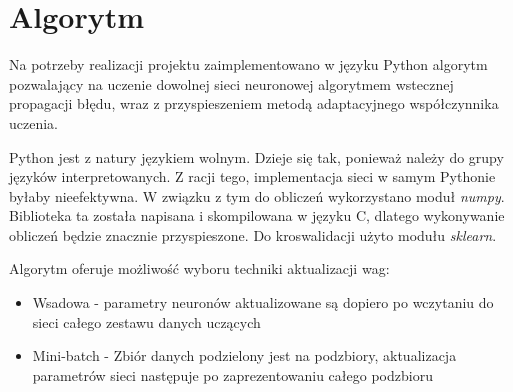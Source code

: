 \documentclass[12pt,twoside]{article}
\begin{document}
\section{Algorytm}

Na potrzeby realizacji projektu zaimplementowano w języku Python algorytm pozwalający na uczenie dowolnej sieci neuronowej algorytmem wstecznej propagacji błędu, wraz z przyspieszeniem metodą adaptacyjnego współczynnika uczenia. 

Python jest z natury językiem wolnym. Dzieje się tak, ponieważ należy do grupy języków interpretowanych. Z racji tego, implementacja sieci w samym Pythonie byłaby nieefektywna. W związku z tym do obliczeń wykorzystano moduł \textit{numpy}. Biblioteka ta została napisana i skompilowana w języku C, dlatego wykonywanie obliczeń będzie znacznie przyspieszone. Do kroswalidacji użyto modułu \textit{sklearn}.

Algorytm oferuje możliwość wyboru techniki aktualizacji wag:
\begin{itemize}
\item Wsadowa -  parametry neuronów aktualizowane są dopiero po wczytaniu do sieci całego zestawu danych uczących
\item Mini-batch -  Zbiór danych podzielony jest na podzbiory, aktualizacja parametrów sieci następuje po zaprezentowaniu całego podzbioru

\end{itemize}
\end{document}
